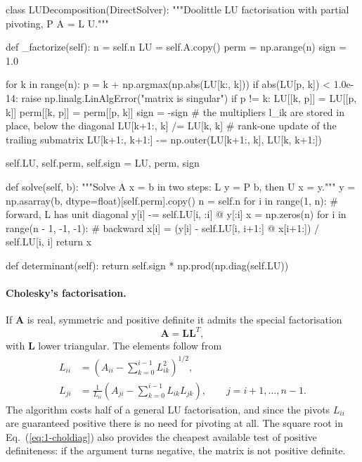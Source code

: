 \begin{Python}{}
class LUDecomposition(DirectSolver):
    """Doolittle LU factorisation with partial pivoting, P A = L U."""

    def _factorize(self):
        n = self.n
        LU = self.A.copy()
        perm = np.arange(n)
        sign = 1.0

        for k in range(n):
            p = k + np.argmax(np.abs(LU[k:, k]))
            if abs(LU[p, k]) < 1.0e-14:
                raise np.linalg.LinAlgError("matrix is singular")
            if p != k:
                LU[[k, p]] = LU[[p, k]]
                perm[[k, p]] = perm[[p, k]]
                sign = -sign
            # the multipliers l_ik are stored in place, below the diagonal
            LU[k+1:, k] /= LU[k, k]
            # rank-one update of the trailing submatrix
            LU[k+1:, k+1:] -= np.outer(LU[k+1:, k], LU[k, k+1:])

        self.LU, self.perm, self.sign = LU, perm, sign

    def solve(self, b):
        """Solve A x = b in two steps: L y = P b, then U x = y."""
        y = np.asarray(b, dtype=float)[self.perm].copy()
        n = self.n
        for i in range(1, n):                    # forward, L has unit diagonal
            y[i] -= self.LU[i, :i] @ y[:i]
        x = np.zeros(n)
        for i in range(n - 1, -1, -1):           # backward
            x[i] = (y[i] - self.LU[i, i+1:] @ x[i+1:]) / self.LU[i, i]
        return x

    def determinant(self):
        return self.sign * np.prod(np.diag(self.LU))
\end{Python}

\paragraph{Cholesky's factorisation.}
If $\bm{A}$ is real, symmetric and positive definite it admits the special
factorisation
\begin{equation}
  \bm{A} = \bm{L}\bm{L}^{T},
  \label{eq:1-cholesky}
\end{equation}
with $\bm{L}$ lower triangular.  The elements follow from
\begin{align}
  L_{ii} &= \left(A_{ii}-\sum_{k=0}^{i-1}L_{ik}^2\right)^{1/2},
  \label{eq:1-choldiag}\\
  L_{ji} &= \frac{1}{L_{ii}}
            \left(A_{ji}-\sum_{k=0}^{i-1}L_{ik}L_{jk}\right),
            \qquad j=i+1,\dots,n-1 .
  \label{eq:1-choloff}
\end{align}
The algorithm costs half of a general LU factorisation, and since the pivots
$L_{ii}$ are guaranteed positive there is no need for pivoting at all.  The
square root in Eq.~(\ref{eq:1-choldiag}) also provides the cheapest available
test of positive definiteness: if the argument turns negative, the matrix is
not positive definite.

